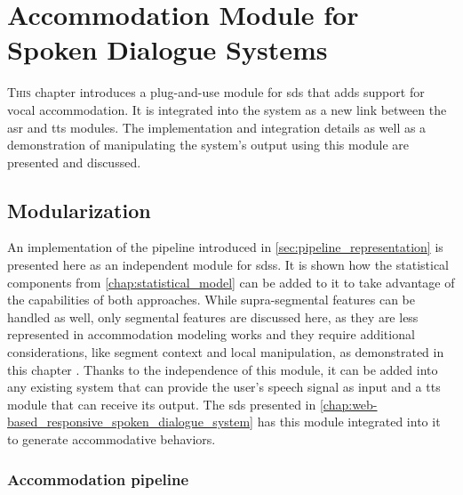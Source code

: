 \chapter[Accommodation Module for Spoken Dialogue Systems]{Accommodation Module for\\Spoken Dialogue Systems}
\label{chap:convergence_module_for_sdss}

\lettrine{T}{his} chapter introduces a plug-and-use module for \acs{sds} that adds support for vocal accommodation.
It is integrated into the system as a new link between the \acs{asr} and \acs{tts} modules.
The implementation and integration details as well as a demonstration of manipulating the system's output using this module are presented and discussed.

\pagebreak

\section{Modularization}
\label{sec:modularization}

An implementation of the pipeline introduced in \cref{sec:pipeline_representation} is presented here as an independent module for \acp{sds}.
It is shown how the statistical components from \cref{chap:statistical_model} can be added to it to take advantage of the capabilities of both approaches.
While supra-segmental features can be handled as well, only segmental features are discussed here, as they are less represented in accommodation modeling works and they require additional considerations, like segment context and local manipulation, as demonstrated in this chapter \citep[as explained in][]{Raveh2017SemDial}.
Thanks to the independence of this module, it can be added into any existing system that can provide the user's speech signal as input and a \ac{tts} module that can receive its output.
The \ac{sds} presented in \cref{chap:web-based_responsive_spoken_dialogue_system} has this module integrated into it to generate accommodative behaviors.

\subsection{Accommodation pipeline}
\label{subsec:computational_model}


